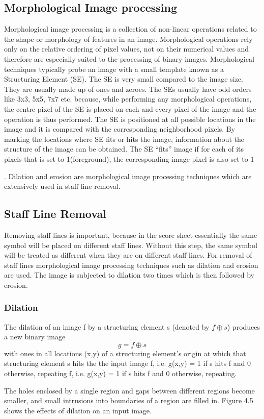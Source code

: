 \documentclass[journal]{IEEEtran}
\begin{document}
\subsection{Morphological Image processing}
Morphological image processing is a collection of non-linear operations related to the shape or morphology of features in an image. Morphological operations rely only on the relative ordering of
pixel values, not on their numerical values and therefore are especially suited to the processing of binary images. Morphological techniques typically probe an image with a small template known as a Structuring Element (SE). The SE is very small compared to the image size. They are usually made up of
ones and zeroes. The SEs usually have odd orders like 3x3, 5x5, 7x7 etc. because, while performing any morphological operations, the centre pixel of the SE is placed on each and every pixel of the
image and the operation is thus performed. The SE is positioned at all possible locations in the image and it is compared with the corresponding neighborhood pixels. By marking the locations
where SE fits or hits the image, information about the structure of the image can be obtained. The SE ``fits” image if for each of its pixels that is set to 1(foreground), the corresponding image pixel
is also set to 1 \par. Dilation and erosion are morphological image processing techniques which are extensively used in staff line removal.

\subsection{Staff Line Removal}
 Removing staff lines is important, because
in the score sheet essentially the same symbol will be placed on different staff lines. Without this step, the same symbol will be treated as different when they are on different staff lines. For removal of staff lines morphological image processing techniques such as dilation and erosion are used. The image is subjected to dilation two times which is then followed by erosion.

\subsubsection{Dilation}
The dilation of an image f by a structuring element s (denoted by $ f \oplus s $)
produces a new binary image 
\[g = f \oplus s \] 
with ones in all locations (x,y) of a structuring element’s origin at which that structuring element s hits the the input image f, i.e. g(x,y) = 1 if s hits f and 0 otherwise, repeating f, i.e. g(x,y) = 1 if s hits f and 0 otherwise, repeating. \par
The holes enclosed by a single region and gaps between different regions become smaller, and
small intrusions into boundaries of a region are filled in. Figure 4.5 shows the effects of dilation on an input image.
\end{document}
